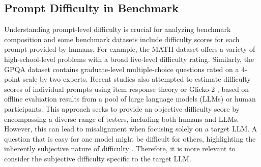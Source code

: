 \subsection{Prompt Difficulty in Benchmark}
Understanding prompt-level difficulty is crucial for analyzing benchmark composition and some benchmark datasets include difficulty scores for each prompt provided by humans. For example, the MATH dataset \citep{hendrycks2measuring} offers a variety of high-school-level problems with a broad five-level difficulty rating. Similarly, the GPQA dataset \citep{rein2023gpqa} contains graduate-level multiple-choice questions rated on a 4-point scale by two experts. Recent studies \citep{ding2024easy2hard,polotinybenchmarks} also attempted to estimate difficulty scores of individual prompts using item response theory \citep{cai2016item,natesan2016bayesian} or Glicko-2 \citep{glickman2012example}, based on offline evaluation results from a pool of large language models (LLMs) or human participants. This approach seeks to provide an objective difficulty score by encompassing a diverse range of testers, including both humans and LLMs. However, this can lead to misalignment when focusing solely on a target LLM. A question that is easy for one model might be difficult for others, highlighting the inherently subjective nature of difficulty \citep{desender2017subjective}. Therefore, it is more relevant to consider the subjective difficulty specific to the target LLM.